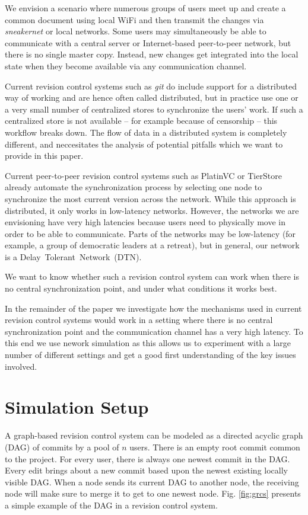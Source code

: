 \documentclass[letterpaper,conference]{IEEEtran}
\begin{document}
We envision a scenario where numerous groups of users meet up and create a common document using local WiFi and then transmit the changes via \textit{sneakernet} or local networks. Some users may simultaneously be able to communicate with a central server or Internet-based peer-to-peer network, but there is no single master copy. Instead, new changes get integrated into the local state when they become available via any communication channel.

Current revision control systems such as \textit{git} do include support for a distributed way of working and are hence often called distributed, but in practice use one or a very small number of centralized stores to synchronize the users' work. If such a centralized store is not available -- for example because of censorship -- this workflow breaks down. The flow of data in a distributed system is completely different, and neccesitates the analysis of potential pitfalls which we want to provide in this paper.

Current peer-to-peer revision control systems such as PlatinVC\cite{mukherjee2005fully} or TierStore\cite{demmer2008tierstore} already automate the synchronization process by selecting one node to synchronize the most current version across the network. While this approach is distributed, it only works in low-latency networks. However, the networks we are envisioning have very high latencies because users need to physically move in order to be able to communicate. Parts of the networks may be low-latency (for example, a group of democratic leaders at a retreat), but in general, our network is a Delay~Tolerant~Network~(DTN).

We want to know whether such a revision control system can work when there is no central synchronization point, and under what conditions it works best.

In the remainder of the paper we investigate how the mechanisms used in current revision control systems would work in a setting where there is no central synchronization point and the communication channel has a very high latency. To this end we use nework simulation as this allows us to experiment with a large number of different settings and get a good first understanding of the key issues involved.  

\section{Simulation Setup}

A graph-based revision control system can be modeled as a directed acyclic graph (DAG) of commits by a pool of $n$ users. There is an empty root commit common to the project. For every user, there is always one newest commit in the DAG. Every edit brings about a new commit based upon the newest existing locally visible DAG. When a node sends its current DAG to another node, the receiving node will make sure to merge it to get to one newest node. Fig. \ref{fig:grcs} presents a simple example of the DAG in a revision control system.
\end{document}
